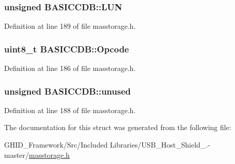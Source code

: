 \hypertarget{struct_b_a_s_i_c_c_d_b_a2cec985f2fd10576a004108c01d42fb4}{
\subsubsection[{\-L\-U\-N}]{\setlength{\rightskip}{0pt plus 5cm}unsigned {\bf \-B\-A\-S\-I\-C\-C\-D\-B\-::\-L\-U\-N}}}\label{struct_b_a_s_i_c_c_d_b_a2cec985f2fd10576a004108c01d42fb4}


\-Definition at line 189 of file masstorage.\-h.

\hypertarget{struct_b_a_s_i_c_c_d_b_a64d8bea0216a84b8ba8c8f411ceae2c3}{
\subsubsection[{\-Opcode}]{\setlength{\rightskip}{0pt plus 5cm}uint8\-\_\-t {\bf \-B\-A\-S\-I\-C\-C\-D\-B\-::\-Opcode}}}\label{struct_b_a_s_i_c_c_d_b_a64d8bea0216a84b8ba8c8f411ceae2c3}


\-Definition at line 186 of file masstorage.\-h.

\hypertarget{struct_b_a_s_i_c_c_d_b_a2c6031f3dde94acd5d03c80db213c534}{
\subsubsection[{unused}]{\setlength{\rightskip}{0pt plus 5cm}unsigned {\bf \-B\-A\-S\-I\-C\-C\-D\-B\-::unused}}}\label{struct_b_a_s_i_c_c_d_b_a2c6031f3dde94acd5d03c80db213c534}


\-Definition at line 188 of file masstorage.\-h.



\-The documentation for this struct was generated from the following file\-:\begin{DoxyCompactItemize}
\item 
\-G\-H\-I\-D\-\_\-\-Framework/\-Src/\-Included Libraries/\-U\-S\-B\-\_\-\-Host\-\_\-\-Shield\-\_.-\/master/\hyperlink{masstorage_8h}{masstorage.\-h}\end{DoxyCompactItemize}
